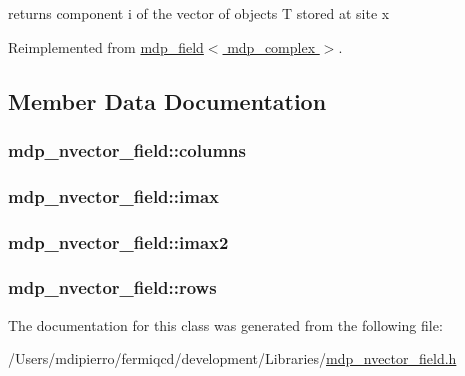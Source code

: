 returns component i of the vector of objects T stored at site x 

Reimplemented from \hyperlink{classmdp__field_a9eec94ee723253a196ccc4677832b4a0}{mdp\_\-field$<$ mdp\_\-complex $>$}.

\subsection{Member Data Documentation}
\hypertarget{classmdp__nvector__field_a796e400fc808b5271faa95abb27ded15}{
\subsubsection[{columns}]{ {\bf mdp\_\-nvector\_\-field::columns}}}
\label{classmdp__nvector__field_a796e400fc808b5271faa95abb27ded15}
\hypertarget{classmdp__nvector__field_a7c183e06584fdf73fedf889ef1186cdd}{
\subsubsection[{imax}]{ {\bf mdp\_\-nvector\_\-field::imax}}}
\label{classmdp__nvector__field_a7c183e06584fdf73fedf889ef1186cdd}
\hypertarget{classmdp__nvector__field_ac123ef55f792faa34a2429853f7872f6}{
\subsubsection[{imax2}]{ {\bf mdp\_\-nvector\_\-field::imax2}}}
\label{classmdp__nvector__field_ac123ef55f792faa34a2429853f7872f6}
\hypertarget{classmdp__nvector__field_a8938e7e300995ed6733a2c405a80cfb3}{
\subsubsection[{rows}]{ {\bf mdp\_\-nvector\_\-field::rows}}}
\label{classmdp__nvector__field_a8938e7e300995ed6733a2c405a80cfb3}


The documentation for this class was generated from the following file:\begin{DoxyCompactItemize}
\item 
/Users/mdipierro/fermiqcd/development/Libraries/\hyperlink{mdp__nvector__field_8h}{mdp\_\-nvector\_\-field.h}\end{DoxyCompactItemize}

